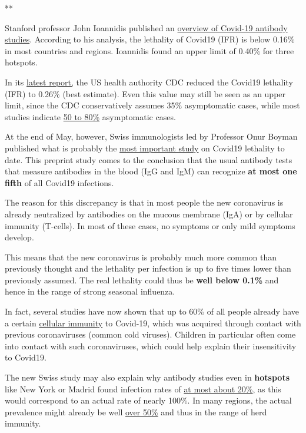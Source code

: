 **

Stanford professor John Ioannidis published an
\href{https://swprs.org/studies-on-covid-19-lethality/}{overview of
Covid-19 antibody studies}. According to his analysis, the lethality of
Covid19 (IFR) is below 0.16\% in most countries and regions. Ioannidis
found an upper limit of 0.40\% for three hotspots.

In its
\href{https://reason.com/2020/05/24/the-cdcs-new-best-estimate-implies-a-covid-19-infection-fatality-rate-below-0-3/}{latest
report,} the US health authority CDC reduced the Covid19 lethality (IFR)
to 0.26\% (best estimate). Even this value may still be seen as an upper
limit, since the CDC conservatively assumes 35\% asymptomatic cases,
while most studies indicate
\href{https://www.bmj.com/content/369/bmj.m1375}{50 to 80\%}
asymptomatic cases.

At the end of May, however, Swiss immunologists led by Professor Onur
Boyman published what is probably the
\href{https://swprs.org/coronavirus-antibody-tests-show-only-one-fifth-of-infections/}{most
important study} on Covid19 lethality to date. This preprint study comes
to the conclusion that the usual antibody tests that measure antibodies
in the blood (IgG and IgM) can recognize \textbf{at most one fifth} of
all Covid19 infections.

The reason for this discrepancy is that in most people the new
coronavirus is already neutralized by antibodies on the mucous membrane
(IgA) or by cellular immunity (T-cells). In most of these cases, no
symptoms or only mild symptoms develop.

This means that the new coronavirus is probably much more common than
previously thought and the lethality per infection is up to five times
lower than previously assumed. The real lethality could thus be
\textbf{well below 0.1\%} and hence in the range of strong seasonal
influenza.

In fact, several studies have now shown that up to 60\% of all people
already have a certain
\href{https://www.cell.com/cell/fulltext/S0092-8674(20)30610-3}{cellular
immunity} to Covid-19, which was acquired through contact with previous
coronaviruses (common cold viruses). Children in particular often come
into contact with such coronaviruses, which could help explain their
insensitivity to Covid19.

The new Swiss study may also explain why antibody studies even in
\textbf{hotspots} like New York or Madrid found infection rates of
\href{https://www.governor.ny.gov/news/amid-ongoing-covid-19-pandemic-governor-cuomo-announces-results-completed-antibody-testing}{at
most about 20\%}, as this would correspond to an actual rate of nearly
100\%. In many regions, the actual prevalence might already be well
\href{https://swprs.org/studies-on-covid-19-lethality/}{over 50\%} and
thus in the range of ​​herd immunity.

